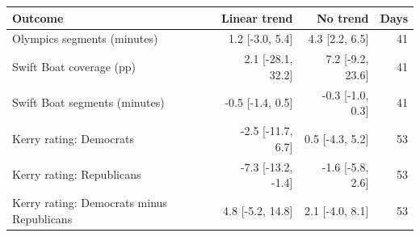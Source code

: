 \begin{tabular}{lrrr}
\toprule
Outcome & Linear trend & No trend & Days \\
\midrule
Olympics segments (minutes) & 1.2 [-3.0, 5.4] & 4.3 [2.2, 6.5] & 41 \\
Swift Boat coverage (pp) & 2.1 [-28.1, 32.2] & 7.2 [-9.2, 23.6] & 41 \\
Swift Boat segments (minutes) & -0.5 [-1.4, 0.5] & -0.3 [-1.0, 0.3] & 41 \\
Kerry rating: Democrats & -2.5 [-11.7, 6.7] & 0.5 [-4.3, 5.2] & 53 \\
Kerry rating: Republicans & -7.3 [-13.2, -1.4] & -1.6 [-5.8, 2.6] & 53 \\
Kerry rating: Democrats minus Republicans & 4.8 [-5.2, 14.8] & 2.1 [-4.0, 8.1] & 53 \\
\bottomrule
\end{tabular}
